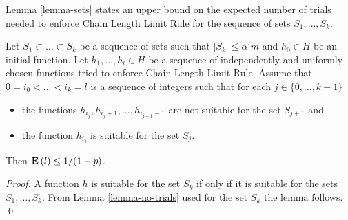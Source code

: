 Lemma \ref{lemma-sets} states an upper bound on the expected number of trials needed to enforce Chain Length Limit Rule for the sequence of sets $S_1, \dots, S_k$.
\begin{lemma}
\label{lemma-sets}
Let $S_1 \subset \dots \subset S_k$ be a sequence of sets such that $|S_k| \leq \alpha' m$ and $h_0 \in H$ be an initial function. Let $h_1, \dots, h_l \in H$ be a sequence of independently and uniformly chosen functions tried to enforce Chain Length Limit Rule. Assume that $0 = i_0 < \dots < i_k = l$ is a sequence of integers such that for each $j \in \{0, \dots, k - 1\}$
\begin{itemize}
\item the functions $h_{i_{j}}, h_{i_{j} + 1}, \dots, h_{i_{j + 1} - 1}$ are not suitable for the set $S_{j + 1}$ and 
\item the function $h_{i_{j}}$ is suitable for the set $S_j$.
\end{itemize}
Then $\mathbf{E}\left(l\right) \leq {1}/{(1 - p)}$.
\end{lemma}
\begin{proof}
A function $h$ is suitable for the set $S_k$ if only if it is suitable for the sets $S_1, \dots, S_k$. From Lemma \ref{lemma-no-trials} used for the set $S_k$ the lemma follows.
\qed
\end{proof}

